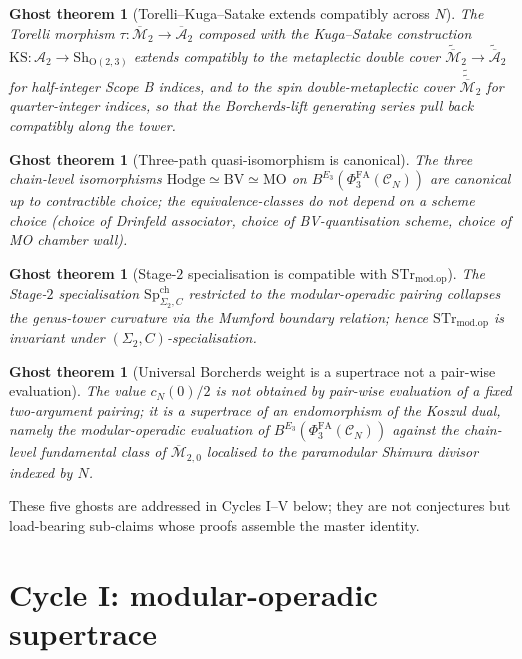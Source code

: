\documentclass[11pt]{amsart}
\newtheorem{ghost}[theorem]{Ghost theorem}
\providecommand{\cC}{\mathcal{C}}
\providecommand{\cA}{\mathcal{A}}
\providecommand{\PhiFA}{\Phi^{\mathrm{FA}}}
\providecommand{\SpCh}{\mathrm{Sp}^{\mathrm{ch}}}
\providecommand{\Mbar}{\overline{\mathcal{M}}}
\providecommand{\Abar}{\overline{\mathcal{A}}}
\providecommand{\KS}{\mathrm{KS}}
\providecommand{\STr}{\mathrm{STr}}
\providecommand{\modop}{\mathrm{mod.op}}
\begin{document}
\begin{ghost}[Torelli--Kuga--Satake extends compatibly across $N$]
\label{ghost:ks-compatibility}
The Torelli morphism $\tau \colon \Mbar_2 \to \Abar_2$ composed with
the Kuga--Satake construction $\KS \colon \cA_2 \to
\mathrm{Sh}_{\mathrm{O}(2, 3)}$ extends compatibly to the metaplectic
double cover $\widetilde{\Mbar}_2 \to \widetilde{\Abar}_2$ for
half-integer Scope B indices, and to the spin double-metaplectic cover
$\widetilde{\widetilde{\Mbar}}_2$ for quarter-integer indices, so that
the Borcherds-lift generating series pull back compatibly along the
tower.
\end{ghost}

\begin{ghost}[Three-path quasi-isomorphism is canonical]
\label{ghost:three-path-canonical}
The three chain-level isomorphisms
$\mathrm{Hodge} \simeq \mathrm{BV} \simeq \mathrm{MO}$ on
$B^{E_3}(\PhiFA_3(\cC_N))$ are canonical up to contractible choice;
the equivalence-classes do not depend on a scheme choice (choice of
Drinfeld associator, choice of BV-quantisation scheme, choice of MO
chamber wall).
\end{ghost}

\begin{ghost}[Stage-$2$ specialisation is compatible with
$\STr_{\modop}$]
\label{ghost:stage2-compatibility}
The Stage-$2$ specialisation $\SpCh_{\Sigma_2, C}$ restricted to the
modular-operadic pairing collapses the genus-tower curvature via the
Mumford boundary relation; hence $\STr_{\modop}$ is invariant under
$(\Sigma_2, C)$-specialisation.
\end{ghost}

\begin{ghost}[Universal Borcherds weight is a supertrace not a
pair-wise evaluation]
\label{ghost:universal-supertrace}
The value $c_N(0)/2$ is \emph{not} obtained by pair-wise evaluation
of a fixed two-argument pairing; it is a supertrace of an
endomorphism of the Koszul dual, namely the modular-operadic
evaluation of $B^{E_3}(\PhiFA_3(\cC_N))$ against the chain-level
fundamental class of $\Mbar_{2, 0}$ localised to the paramodular
Shimura divisor indexed by $N$.
\end{ghost}

These five ghosts are addressed in Cycles I--V below; they are not
conjectures but load-bearing sub-claims whose proofs assemble the
master identity.

\section{Cycle I: modular-operadic supertrace}
\label{sec:cycle-1-modop-supertrace}
\end{document}
